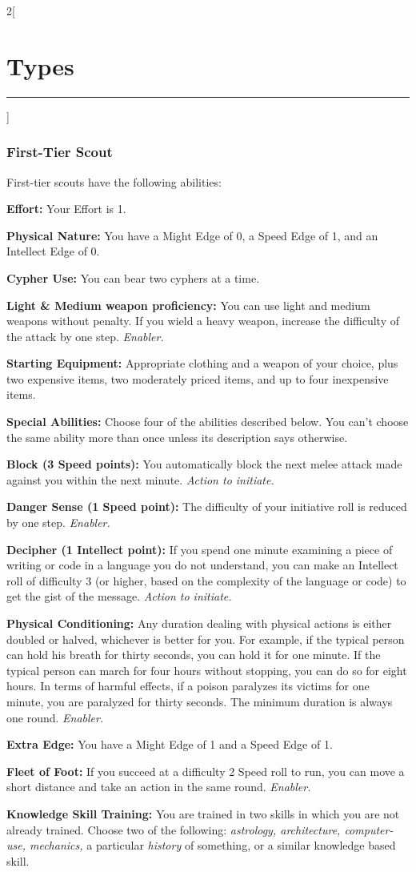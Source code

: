 \documentclass[a4paper,10pt,final]{book}
\newcommand{\HRule}{\rule{\linewidth}{0.5mm}} %
\newcommand{\newSection}[1]{\section*{#1} \addcontentsline{toc}{section}{#1} \label{sec:#1} \HRule}
\newcommand{\itemLine}[2]{\textbf{#1:} {#2}\par}
\newcommand{\itemAbility}[2]{\textcolor{25gray}{\textbullet\textbf{ #1:}} {#2}\par}
\newcommand{\enabler}{\textit{ Enabler.}}
\newcommand{\actionInit}{\textit{ Action to initiate.}}
\newenvironment{docsection}[1]
{
  \begin{multicols*}{2}[\newSection{#1}]
}
{
  \end{multicols*}
  \newpage
}
\begin{document}
\begin{docsection}{Types}
\subsubsection*{First-Tier Scout}
\label{subsub:scoutFirstTier}
First-tier scouts have the following abilities: \par
\itemLine{Effort}{Your Effort is 1.} 
\itemLine{Physical Nature} {You have a Might Edge
of 0, a Speed Edge of 1, and an Intellect Edge of 0.}
\itemLine{Cypher Use}{You can bear two cyphers at a time.}
\itemLine{Light \& Medium weapon proficiency} {You can use light and medium
weapons without penalty. If you wield a
heavy weapon, increase the difficulty of the
attack by one step.\enabler}
\itemLine{Starting Equipment}{Appropriate clothing
and a weapon of your choice, plus two
expensive items, two moderately priced
items, and up to four inexpensive items.}
\itemLine{Special Abilities}{Choose four of the
abilities described below. You can’t choose
the same ability more than once unless its
description says otherwise.}
\itemAbility{Block (3 Speed points)}{You automatically
block the next melee attack made against
you within the next minute.\actionInit}
\itemAbility{Danger Sense (1 Speed point)}{The
difficulty of your initiative roll is reduced by
one step.\enabler}
\itemAbility{Decipher (1 Intellect point)}{If you spend
one minute examining a piece of writing or
code in a language you do not understand,
you can make an Intellect roll of difficulty
3 (or higher, based on the complexity of
the language or code) to get the gist of the
message.\actionInit}
\itemAbility{Physical Conditioning}{Any duration dealing with
physical actions is either doubled or halved,
whichever is better for you. For example,
if the typical person can hold his breath
for thirty seconds, you can hold it for one minute. 
If the typical person can march
for four hours without stopping, you can
do so for eight hours. In terms of harmful
effects, if a poison paralyzes its victims for
one minute, you are paralyzed for thirty
seconds. The minimum duration is always
one round.\enabler}
\itemAbility{Extra Edge}{You have a Might Edge of 1
and a Speed Edge of 1.}
\itemAbility{Fleet of Foot}{If you succeed at a difficulty
2 Speed roll to run, you can move a short
distance and take an action in the same
round.\enabler}
\itemAbility{Knowledge Skill Training}{You are trained in two
skills in which you are not already trained.
Choose two of the following: \textit{astrology, architecture, computer-use, mechanics,} a particular \textit{history} of something, or a similar knowledge based skill. 
}
\end{docsection}
\end{document}
